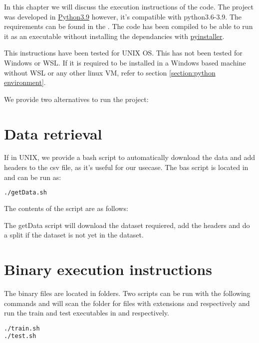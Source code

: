 In this chapter we will discuss the execution instructions of the code. The project was developed in \href{https://docs.python.org/3/whatsnew/3.9.html}{Python3.9} however, it's compatible with python3.6-3.9. The requirements can be found in the . The code has been compiled to be able to run it as an executable without installing the dependancies with \href{https://www.pyinstaller.org/}{pyinstaller}.

This instructions have been tested for UNIX OS. This has not been tested for Windows or WSL. If it is required to be installed in a Windows based machine without WSL or any other linux VM, refer to section \ref{section:python environment}.

We provide two alternatives to run the project: 

\section{Data retrieval}

If in UNIX, we provide a bash script to automatically download the data and add headers to the csv file, as it's useful for our usecase. The bas script is located in  and can be run as: 

\begin{lstlisting}[language=bash]
./getData.sh
\end{lstlisting}

The contents of the script are as follows:



The getData script will download the dataset requiered, add the headers and do a split if the dataset is not yet in the dataset.

\section{Binary execution instructions}

The binary files are located in  folders. Two scripts can be run with the following commands and will scan the  folder for files with extensions  and  respectively and run the train and test executables in  and  respectively.

\begin{lstlisting}[language=bash]
./train.sh
./test.sh
\end{lstlisting}

